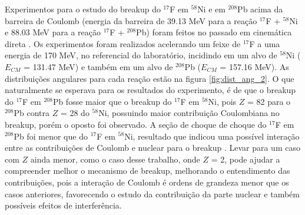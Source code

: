 \documentclass[a4paper,12pt,oneside]{book}
\begin{document}
\par Experimentos para o estudo do breakup do $^{17}$F em $^{58}$Ni e em $^{208}$Pb acima da barreira de Coulomb (energia da barreira de 39.13 MeV para a reação $^{17}$F + $^{58}$Ni e 88.03 MeV para a reação $^{17}$F + $^{208}$Pb) foram feitos no passado em cinemática direta \cite{LIANG200922}. Os experimentos foram realizados acelerando um feixe de $^{17}$F a uma energia de 170 MeV, no referencial do laboratório, incidindo em um alvo de $^{58}$Ni ($E_{CM}$ = 131.47 MeV) e também em um alvo de $^{208}$Pb ($E_{CM}$ = 157.16 MeV). As distribuições angulares para cada reação estão na figura \ref{fig:dist_ang_2}. O que naturalmente se esperava para os resultados do experimento, é de que o breakup do $^{17}$F em $^{208}$Pb fosse maior que o breakup do $^{17}$F em $^{58}$Ni, pois $Z$ = 82 para o $^{208}$Pb contra $Z$ = 28 do $^{58}$Ni, possuindo maior contribuição Coulombiana no breakup, porém o oposto foi observado. A seção de choque de choque do $^{17}$F em $^{208}$Pb foi menor que do $^{17}$F em $^{58}$Ni, resultado que indicou uma possível interação entre as contribuições de Coulomb e nuclear para o breakup \cite{LIANG200922, MORO_BREAKUP}. Levar para um caso com $Z$ ainda menor, como o caso desse trabalho, onde $Z$ = 2, pode ajudar a compreender melhor o mecanismo de breakup, melhorando o entendimento das contribuições, pois a interação de Coulomb é ordens de grandeza menor que os casos anteriores, favorecendo o estudo da contribuição da parte nuclear e também possíveis efeitos de interferência. 


\end{document}
